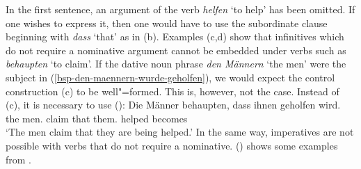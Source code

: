 {\eal
{}
\zl
%
In the first sentence, an argument of the verb \emph{helfen} `to help' has been omitted. If one wishes to express it, then one would have to use
the subordinate clause beginning with \emph{dass} `that' as in (b). Examples (c,d) show that infinitives which do not require a nominative argument cannot be embedded
under verbs such as \emph{behaupten} `to claim'. If the dative noun phrase \emph{den Männern} `the
men' were the subject in (\ref{bsp-den-maennern-wurde-geholfen}), we would expect the control
construction (c) to be well"=formed. This is, however, not the case. Instead of (c), it is necessary to use ():
\ea
\gll Die Männer behaupten, dass ihnen geholfen wird.\\
	 the men.\nom{} claim that them.\dat{} helped becomes\\
\glt `The men claim that they are being helped.'
\z
%
In the same way, imperatives are not possible with verbs that do not require a nominative. () shows some examples from \citet[]{Reis82}.
\eal
{}
}
